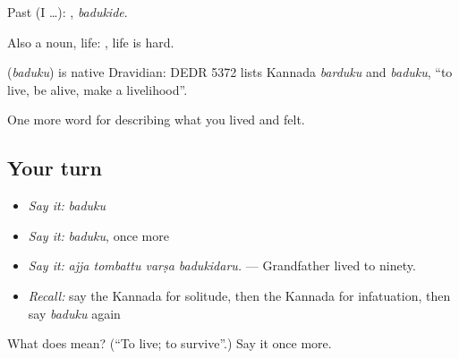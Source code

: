 Past (I …): , \emph{badukide}.

Also a noun, life:  , life is hard.

\begin{cousinweb}
\textbf{} (\emph{baduku}) is native Dravidian: DEDR 5372 lists Kannada \emph{barduku} and \emph{baduku}, \textquotedblleft{}to live, be alive, make a livelihood\textquotedblright{}.
\end{cousinweb}

\begin{grammarlens}[title={What you've built}]
One more word for describing what you lived and felt.
\end{grammarlens}

\subsection*{Your turn}
\begin{itemize}
\raggedright
  \item \emph{Say it:} \emph{baduku}
  \item \emph{Say it:} \emph{baduku}, once more
  \item \emph{Say it:} \emph{ajja tombattu varṣa badukidaru.} — Grandfather lived to ninety.
  \item \emph{Recall:} say the Kannada for solitude, then the Kannada for infatuation, then say \emph{baduku} again
\end{itemize}

\begin{tcolorbox}[breakable,colback=teal!4,colframe=teal!35!black,title={Before you move on}]
What does  mean? (\textquotedblleft{}To live; to survive\textquotedblright{}.) Say it once more.
\end{tcolorbox}
